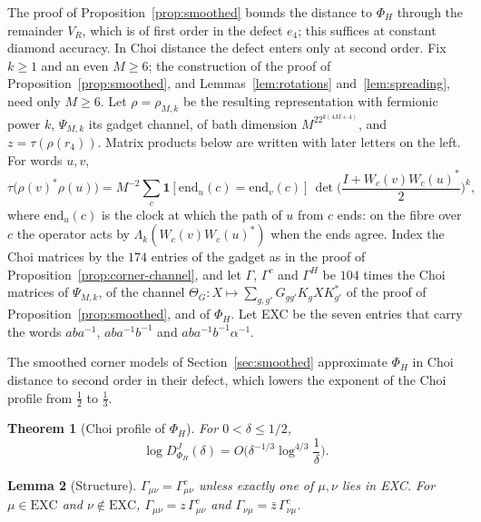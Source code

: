\documentclass[11pt,a4paper]{article}
\theoremstyle{plain}
\newtheorem{theorem}{Theorem}[section]
\newtheorem{lemma}[theorem]{Lemma}
\theoremstyle{definition}
\theoremstyle{remark}
\newcommand{\DChoi}{D^{J}}
\begin{document}
The proof of Proposition~\ref{prop:smoothed} bounds the distance to $\Phi_H$ through the remainder $V_R$, which is of first order in the defect
$e_4$; this suffices at constant diamond accuracy. In Choi distance the defect enters only at second order. Fix $k\ge1$ and an even $M\ge6$; the
construction of the proof of Proposition~\ref{prop:smoothed}, and Lemmas~\ref{lem:rotations} and~\ref{lem:spreading}, need only $M\ge6$. Let $\rho=\rho_{M,k}$
be the resulting representation with fermionic power $k$, $\Psi_{M,k}$ its gadget channel, of bath dimension $M^22^{k(4M+4)}$, and $z=\tau(\rho(r_4))$.
Matrix products below are written with later letters on the left. For words $u,v$,
\begin{equation}\label{eq:fermion-moment}
\tau\big(\rho(v)^*\rho(u)\big)=M^{-2}\sum_c\mathbf 1[\mathrm{end}_u(c)=\mathrm{end}_v(c)]\,\det\Big(\frac{I+W_c(v)W_c(u)^*}2\Big)^k,
\end{equation}
where $\mathrm{end}_u(c)$ is the clock at which the path of $u$ from $c$ ends: on the fibre over $c$ the operator acts by $\Lambda_k(W_c(v)W_c(u)^*)$ when
the ends agree. Index the Choi matrices by the $174$ entries of the gadget as in the proof of Proposition~\ref{prop:corner-channel}, and let
$\Gamma$, $\Gamma^c$ and $\Gamma^H$ be $104$ times the Choi matrices of $\Psi_{M,k}$, of the channel $\Theta_G:X\mapsto\sum_{g,g'}G_{gg'}K_gXK_{g'}^*$ of the
proof of Proposition~\ref{prop:smoothed}, and of $\Phi_H$. Let EXC be the seven entries that carry the words $aba^{-1}$, $aba^{-1}b^{-1}$ and
$aba^{-1}b^{-1}\alpha^{-1}$.


The smoothed corner models of Section~\ref{sec:smoothed} approximate $\Phi_H$ in Choi distance to second order in their defect, which lowers the
exponent of the Choi profile from $\frac12$ to $\frac13$.

\begin{theorem}[Choi profile of $\Phi_H$]\label{thm:choi-profile}
For $0<\delta\le1/2$,
\[
\log\DChoi_{\Phi_H}(\delta)=O\Big(\delta^{-1/3}\log^{4/3}\frac1\delta\Big).
\]
\end{theorem}


\begin{lemma}[Structure]\label{lem:choi-structure}
$\Gamma_{\mu\nu}=\Gamma^c_{\mu\nu}$ unless exactly one of $\mu,\nu$ lies in EXC. For $\mu\in\mathrm{EXC}$ and $\nu\notin\mathrm{EXC}$, $\Gamma_{\mu\nu}=z\,\Gamma^c_{\mu\nu}$ and
$\Gamma_{\nu\mu}=\bar z\,\Gamma^c_{\nu\mu}$.
\end{lemma}
\end{document}
